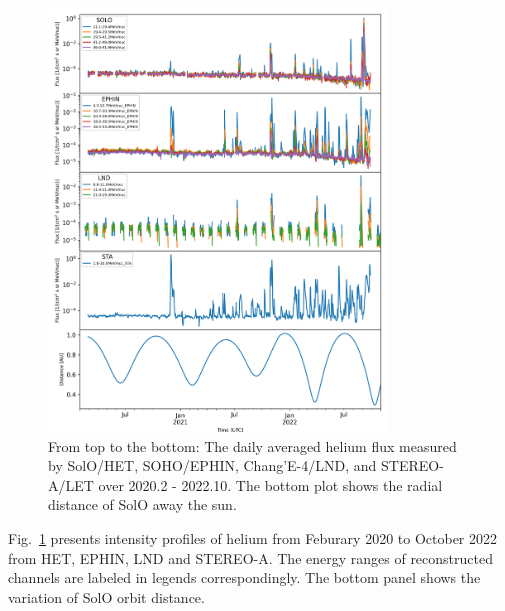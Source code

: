 \begin{figure}[!htb]
    \centering
    \includegraphics[width = 0.8\textwidth]{images/ACR/overview_Helium_4_instrument.png}
    \caption[Overview of helium intensities measured by different instruments]{From top to the bottom: The daily averaged helium flux measured by \ac{SolO}/\ac{HET}, \ac{SOHO}/\ac{EPHIN}, Chang'E-4/\ac{LND}, and \ac{STEREO}-A/\ac{LET} over 2020.2 - 2022.10. The bottom plot shows the radial distance of \ac{SolO} away the sun.}
    \label{fig:overview_helium_intensity}
\end{figure}

Fig.~\ref{fig:overview_helium_intensity} presents intensity profiles of helium from Feburary 2020 to October 2022 from \ac{HET}, \ac{EPHIN}, \ac{LND} and \ac{STEREO}-A. The energy ranges of reconstructed channels are labeled in legends correspondingly. The bottom panel shows the variation of \ac{SolO} orbit distance.


